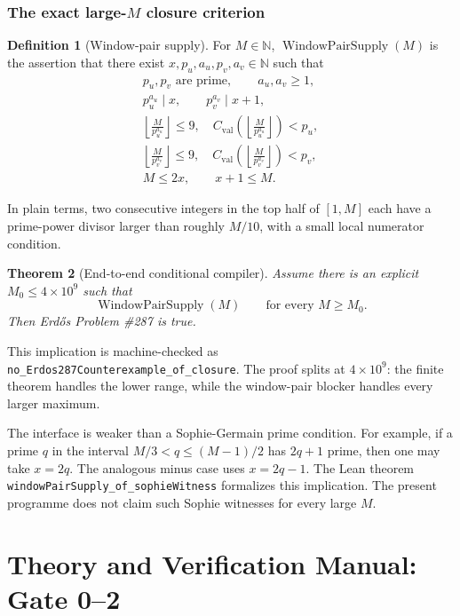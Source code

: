 \documentclass[11pt]{article}
\newtheorem{theorem}{Theorem}[section]
\theoremstyle{definition}
\newtheorem{definition}[theorem]{Definition}
\newcommand{\N}{\mathbb N}
\newcommand{\1}{\mathbf 1}
\newcommand{\WPS}{\operatorname{WindowPairSupply}}
\begin{document}
\section{The exact large-$M$ closure criterion}

\begin{definition}[Window-pair supply]
For $M\in\N$, $\WPS(M)$ is the assertion that there exist
$x,p_u,a_u,p_v,a_v\in\N$ such that
\[
\begin{gathered}
p_u,p_v\text{ are prime},\qquad a_u,a_v\ge1,\\
p_u^{a_u}\mid x,\qquad p_v^{a_v}\mid x+1,\\
\left\lfloor\frac M{p_u^{a_u}}\right\rfloor\le9,
\quad C_{\mathrm{val}}\!\left(\left\lfloor\frac M{p_u^{a_u}}\right\rfloor\right)<p_u,\\
\left\lfloor\frac M{p_v^{a_v}}\right\rfloor\le9,
\quad C_{\mathrm{val}}\!\left(\left\lfloor\frac M{p_v^{a_v}}\right\rfloor\right)<p_v,\\
M\le2x,
\qquad x+1\le M.
\end{gathered}
\]
\end{definition}

In plain terms, two consecutive integers in the top half of $[1,M]$ each have a
prime-power divisor larger than roughly $M/10$, with a small local numerator condition.

\begin{theorem}[End-to-end conditional compiler]
Assume there is an explicit $M_0\le4\times10^9$ such that
\[
\WPS(M)\qquad\text{for every }M\ge M_0.
\]
Then Erd\H{o}s Problem \#287 is true.
\end{theorem}

This implication is machine-checked as
\texttt{no\_Erdos287Counterexample\_of\_closure}.  The proof splits at
$4\times10^9$: the finite theorem handles the lower range, while the window-pair blocker
handles every larger maximum.

The interface is weaker than a Sophie-Germain prime condition.  For example, if a prime
$q$ in the interval $M/3<q\le(M-1)/2$ has $2q+1$ prime, then one may take
$x=2q$.  The analogous minus case uses $x=2q-1$.  The Lean theorem
\texttt{windowPairSupply\_of\_sophieWitness} formalizes this implication.  The present
programme does not claim such Sophie witnesses for every large $M$.



\clearpage
\part{Theory and Verification Manual: Gate 0--2}
\label{part:theory-manual}
\end{document}
